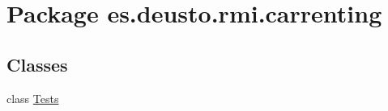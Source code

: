 \hypertarget{namespacees_1_1deusto_1_1rmi_1_1carrenting}{}\section{Package es.\+deusto.\+rmi.\+carrenting}
\label{namespacees_1_1deusto_1_1rmi_1_1carrenting}
\subsection*{Classes}
\begin{DoxyCompactItemize}
\item 
class \mbox{\hyperlink{classes_1_1deusto_1_1rmi_1_1carrenting_1_1_tests}{Tests}}
\end{DoxyCompactItemize}

